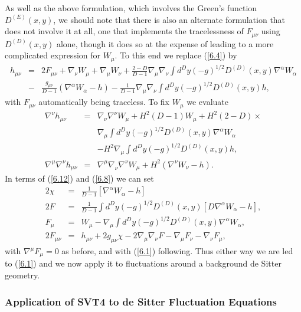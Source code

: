 As well as the above formulation, which involves the Green's function $D^{(E)}(x,y)$, we should note that there is also an alternate formulation that does not involve it at all, one that implements the tracelessness of $F_{\mu\nu}$ using $D^{(D)}(x,y)$ alone, though it does so at the expense of leading to a more complicated expression for $W_{\mu}$. To this end we replace (\ref{6.4}) by 
%
\begin{eqnarray}
h_{\mu\nu}&=&2F_{\mu\nu}+\nabla_{\nu}W_{\mu}+\nabla_{\mu}W_{\nu}+\frac{2-D}{D-1}\nabla_{\mu}\nabla_{\nu}\int d^Dy(-g)^{1/2}D^{(D)}(x,y)\nabla^{\alpha}W_{\alpha}
\nonumber\\
&-&\frac{g_{\mu\nu}}{D-1}(\nabla^{\alpha}W_{\alpha}-h)-\frac{1}{D-1}\nabla_{\mu}\nabla_{\nu}\int d^Dy(-g)^{1/2}D^{(D)}(x,y)h,
\label{6.12}
\end{eqnarray}
%
with $F_{\mu\nu}$ automatically being traceless. To fix $W_{\mu}$ we evaluate 
%
\begin{eqnarray}
\nabla^{\nu}h_{\mu\nu}&=&\nabla_{\nu}\nabla^{\nu}W_{\mu}+H^2(D-1)W_{\mu}
+H^2(2-D)\times
\nonumber\\
&&\nabla_{\mu}\int d^Dy(-g)^{1/2}D^{(D)}(x,y)\nabla^{\alpha}W_{\alpha}
\nonumber\\
&&
-H^2\nabla_{\mu}\int d^Dy(-g)^{1/2}D^{(D)}(x,y)h,
\nonumber\\
\nabla^{\mu}\nabla^{\nu}h_{\mu\nu}&=&\nabla^{\mu}\nabla_{\nu}\nabla^{\nu}W_{\mu}+H^2(\nabla^{\nu}W_{\nu}-h).
\label{6.13}
\end{eqnarray}
%
In terms of (\ref{6.12}) and (\ref{6.8}) we can set 
%
\begin{eqnarray}
2\chi&=&\frac{1}{D-1}[\nabla^{\alpha}W_{\alpha}-h]
\nonumber\\
 2F&=&\frac{1}{D-1}\int d^Dy(-g)^{1/2}D^{(D)}(x,y)[D\nabla^{\alpha}W_{\alpha}-h],
\nonumber\\
F_{\mu}&=&W_{\mu}-\nabla_{\mu}\int d^Dy(-g)^{1/2}D^{(D)}(x,y)\nabla^{\alpha}W_{\alpha},
\nonumber\\
2F_{\mu\nu}&=&h_{\mu\nu}+2g_{\mu\nu}\chi-2\nabla_{\mu}\nabla_{\nu}F
- \nabla_{\mu}F_{\nu}-\nabla_{\nu}F_{\mu},
\label{6.14}
\end{eqnarray}
%
with $\nabla^{\mu}F_{\mu}=0$ as before, and with (\ref{6.1}) following. Thus either way we are led to (\ref{6.1}) and we now apply it to fluctuations around a background de Sitter geometry.

\subsubsection{Application of SVT4 to de Sitter Fluctuation Equations}
\label{sss:application_to_ds4_svt4}

